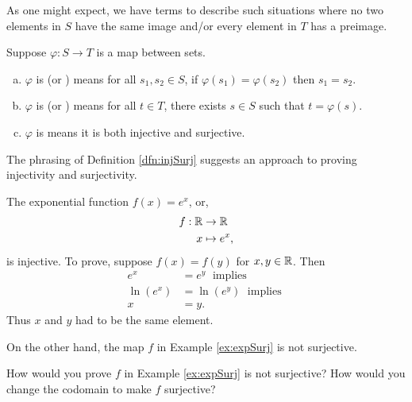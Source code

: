 \documentclass[../algebraNotesMSRI-UP2016.tex]{subfiles}
\begin{document}
\begin{frame}
As one might expect, we have terms to describe such situations where no two elements in $S$ have the same image and/or every element in $T$ has a preimage.

\smallGap
\begin{dfn}\label{dfn:injSurj}
Suppose $\varphi:S\to T$ is a map between sets.
\begin{enumerate}[(a)]
\item\label{dfn:inj} $\varphi$ is  (or ) means for all $s_1,s_2\in S$, if $\varphi(s_1)=\varphi(s_2)$ then $s_1=s_2$.
\item\label{dfn:surj} $\varphi$ is  (or ) means for all $t\in T$, there exists $s\in S$ such that $t=\varphi(s)$.
\item $\varphi$ is  means it is both injective and surjective.
\end{enumerate}
\end{dfn}

\smallGap
The phrasing of Definition \ref{dfn:injSurj} suggests an approach to proving injectivity and surjectivity.
\end{frame}

\begin{frame}%
\begin{ex}\label{ex:expSurj}
The exponential function $f(x)=e^x$, or,  
\begin{align*}
f:\mathbb R &\to \mathbb R \\
 x &\mapsto e^x,
\end{align*}
is injective.  To prove, suppose $f(x)=f(y)$ for $x,y\in \mathbb R$.  Then 
\begin{align*}
e^x &= e^y\; \text{ implies } \\
\ln{(e^x)} &= \ln{(e^y)}\; \text{ implies } \\
x &= y. 
\end{align*}
Thus $x$ and $y$ had to be the same element.
\end{ex}
\end{frame}

\begin{frame}[c]
On the other hand, the map $f$ in Example \ref{ex:expSurj} is not surjective.

\smallGap
\begin{que}
How would you prove $f$ in Example \ref{ex:expSurj} is not surjective?  How would you change the codomain to make $f$ surjective?
\end{que}
\end{frame}
\end{document}
